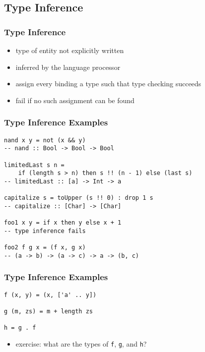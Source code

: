 \documentclass[dvipsnames]{beamer}
\theoremstyle{plain}
\begin{document}
\subsection{Type Inference}

\begin{frame}
  \frametitle{Type Inference}

  \begin{itemize}
    \item type of entity not explicitly written
    \item inferred by the language processor

    \medskip
    \item assign every binding a type such that type checking succeeds
    \item fail if no such assignment can be found
  \end{itemize}
\end{frame}

\begin{frame}[fragile]
  \frametitle{Type Inference Examples}

  \begin{lstlisting}
nand x y = not (x && y)
-- nand :: Bool -> Bool -> Bool

limitedLast s n =
    if (length s > n) then s !! (n - 1) else (last s)
-- limitedLast :: [a] -> Int -> a

capitalize s = toUpper (s !! 0) : drop 1 s
-- capitalize :: [Char] -> [Char]

foo1 x y = if x then y else x + 1
-- type inference fails

foo2 f g x = (f x, g x)
-- (a -> b) -> (a -> c) -> a -> (b, c)
  \end{lstlisting}

\end{frame}

\begin{frame}[fragile]
  \frametitle{Type Inference Examples}

  \begin{lstlisting}
f (x, y) = (x, ['a' .. y])

g (m, zs) = m + length zs

h = g . f
  \end{lstlisting}

  \medskip
  \begin{itemize}
    \item exercise: what are the types of \lstinline|f|, \lstinline|g|,
      and \lstinline|h|?
  \end{itemize}
\end{frame}
\end{document}
